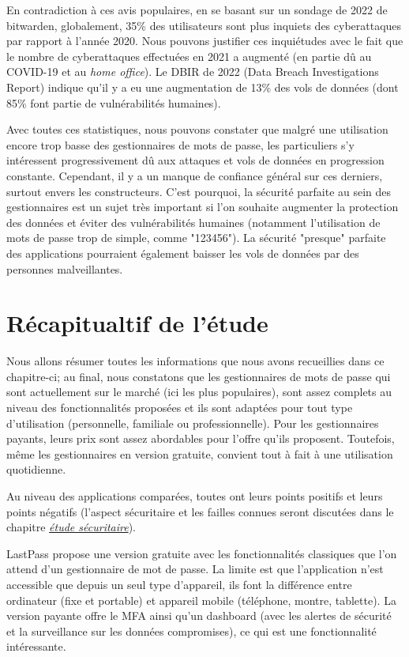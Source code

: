 En contradiction à ces avis populaires, en se basant sur un sondage de 2022 de bitwarden\cite{bitwardenreport}, globalement, 35\% des utilisateurs sont plus inquiets des cyberattaques par rapport à l'année 2020. Nous pouvons justifier ces inquiétudes avec le fait que le nombre de cyberattaques effectuées en 2021 a augmenté (en partie dû au COVID-19 et au \textit{home office}). Le DBIR de 2022 (Data Breach Investigations Report)\cite{dbir} indique qu'il y a eu une augmentation de 13\% des vols de données (dont 85\% font partie de vulnérabilités humaines).

Avec toutes ces statistiques, nous pouvons constater que malgré une utilisation encore trop basse des gestionnaires de mots de passe, les particuliers s'y intéressent progressivement dû aux attaques et vols de données en progression constante. Cependant, il y a un manque de confiance général sur ces derniers, surtout envers les constructeurs. C'est pourquoi, la sécurité parfaite au sein des gestionnaires est un sujet très important si l'on souhaite augmenter la protection des données et éviter des vulnérabilités humaines (notamment l'utilisation de mots de passe trop de simple, comme "123456"). La sécurité "presque" parfaite des applications pourraient également baisser les vols de données par des personnes malveillantes.
\section{Récapitualtif de l'étude}
Nous allons résumer toutes les informations que nous avons recueillies dans ce chapitre-ci; au final, nous constatons que les gestionnaires de mots de passe qui sont actuellement sur le marché (ici les plus populaires), sont assez complets au niveau des fonctionnalités proposées et ils sont adaptées pour tout type d'utilisation (personnelle, familiale ou professionnelle). Pour les gestionnaires payants, leurs prix sont assez abordables pour l'offre qu'ils proposent. Toutefois, même les gestionnaires en version gratuite, convient tout à fait à une utilisation quotidienne.

Au niveau des applications comparées, toutes ont leurs points positifs et leurs points négatifs (l'aspect sécuritaire et les failles connues seront discutées dans le chapitre \hyperref[ch:etude_secu]{\textit{étude sécuritaire}}). 

LastPass propose une version gratuite avec les fonctionnalités classiques que l'on attend d'un gestionnaire de mot de passe. La limite est que l'application n'est accessible que depuis un seul type d'appareil, ils font la différence entre ordinateur (fixe et portable) et appareil mobile (téléphone, montre, tablette). La version payante offre le MFA ainsi qu'un dashboard (avec les alertes de sécurité et la surveillance sur les données compromises), ce qui est une fonctionnalité intéressante.


